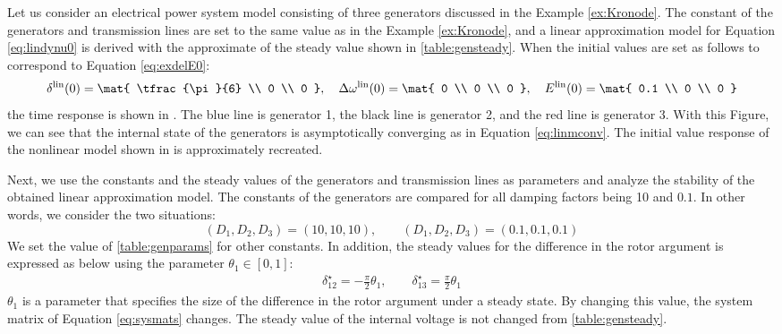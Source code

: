 \documentclass[tombow,dvipdfmx]{corona-a5-1.1}
\begin{document}



\begin{例}\label{ex:linsyssim}
Let us consider an electrical power system model consisting of three generators discussed in the Example \ref{ex:Kronode}.
The constant of the generators and transmission lines are set to the same value as in the Example \ref{ex:Kronode}, and a linear approximation model for Equation \ref{eq:lindynu0} is derived with the approximate of the steady value shown in \ref{table:gensteady}.
When the initial values are set as follows to correspond to Equation \ref{eq:exdelE0}:
\begin{align}\label{eq:linmini}
\delta^{\rm lin}(0)
 =
\mat{
\tfrac{\pi}{6} \\
0 \\
0
},\quad
\Delta \omega^{\rm lin}(0)
 =
\mat{
0 \\
0 \\
0
},\quad
E^{\rm lin}(0)
 =
\mat{
0.1 \\
0 \\
0
}
\end{align}
the time response is shown in . The blue line is generator 1,
the black line is generator 2, and the red line is generator 3. With this
Figure, we can see that the internal state of the generators is asymptotically
converging as in Equation \ref{eq:linmconv}. The initial value response of the
nonlinear model shown in  is approximately recreated. 

Next, we use the constants and the steady values of the generators and
transmission lines as parameters and analyze the stability of the obtained
linear approximation model. The constants of the generators are compared for all
damping factors being 10 and $0.1$. In other words, we consider the two
situations:
\[
(D_1,D_2,D_3)= (10,10,10), \qquad
(D_1,D_2,D_3)= \left(0.1,0.1,0.1\right)
\]
We set the value of \ref{table:genparams} for other constants. In addition, the
steady values for the difference in the rotor argument is expressed as below
using the parameter $\theta_1 \in [0, 1]$:
\begin{align}
\delta_{12}^{\star}= - \frac{\pi}{2} \theta_1
,\qquad
\delta_{13}^{\star}=  \frac{\pi}{2} \theta_1
\end{align}
$\theta_1$ is a parameter that specifies the size of the difference in the rotor argument under a steady state.
By changing this value, the system matrix of Equation \ref{eq:sysmats} changes.
The steady value of the internal voltage is not changed from \ref{table:gensteady}.


\end{例}
\end{document}
